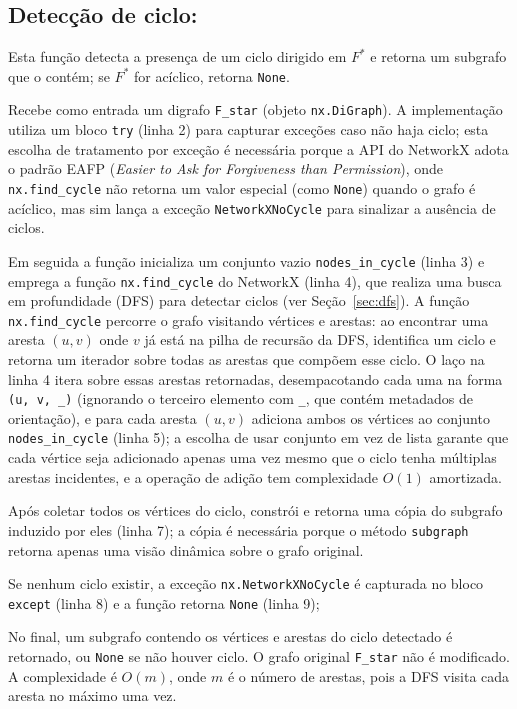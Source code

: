 \subsection{Detecção de ciclo:}
Esta função detecta a presença de um ciclo dirigido em \(F^*\) e retorna um subgrafo que o contém; se \(F^*\) for acíclico, retorna \texttt{None}.

Recebe como entrada um digrafo \texttt{F\_star} (objeto \texttt{nx.DiGraph}). A implementação utiliza um bloco \texttt{try} (linha 2) para capturar exceções caso não haja ciclo; esta escolha de tratamento por exceção é necessária porque a API do NetworkX adota o padrão EAFP (\emph{Easier to Ask for Forgiveness than Permission}), onde \texttt{nx.find\_cycle} não retorna um valor especial (como \texttt{None}) quando o grafo é acíclico, mas sim lança a exceção \texttt{NetworkXNoCycle} para sinalizar a ausência de ciclos.

Em seguida a função inicializa um conjunto vazio \texttt{nodes\_in\_cycle} (linha 3) e emprega a função \texttt{nx.find\_cycle} do NetworkX (linha 4), que realiza uma busca em profundidade (DFS) para detectar ciclos (ver Seção~\ref{sec:dfs}). A função \texttt{nx.find\_cycle} percorre o grafo visitando vértices e arestas: ao encontrar uma aresta \((u,v)\) onde \(v\) já está na pilha de recursão da DFS, identifica um ciclo e retorna um iterador sobre todas as arestas que compõem esse ciclo. O laço na linha 4 itera sobre essas arestas retornadas, desempacotando cada uma na forma \texttt{(u, v, \_)} (ignorando o terceiro elemento com \texttt{\_}, que contém metadados de orientação), e para cada aresta \((u,v)\) adiciona ambos os vértices ao conjunto \texttt{nodes\_in\_cycle} (linha 5); a escolha de usar conjunto em vez de lista garante que cada vértice seja adicionado apenas uma vez mesmo que o ciclo tenha múltiplas arestas incidentes, e a operação de adição tem complexidade \(O(1)\) amortizada.

Após coletar todos os vértices do ciclo, constrói e retorna uma cópia do subgrafo induzido por eles (linha 7); a cópia é necessária porque o método \texttt{subgraph} retorna apenas uma visão dinâmica sobre o grafo original.

Se nenhum ciclo existir, a exceção \texttt{nx.NetworkXNoCycle} é capturada no bloco \texttt{except} (linha 8) e a função retorna \texttt{None} (linha 9);

No final, um subgrafo contendo os vértices e arestas do ciclo detectado é retornado, ou \texttt{None} se não houver ciclo. O grafo original \texttt{F\_star} não é modificado. A complexidade é \(O(m)\), onde \(m\) é o número de arestas, pois a DFS visita cada aresta no máximo uma vez.

